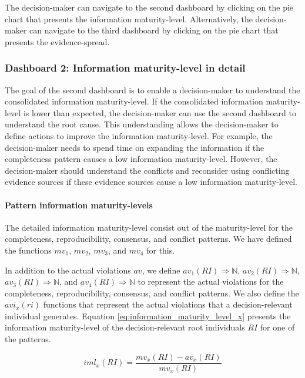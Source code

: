 The decision-maker can navigate to the second dashboard by clicking on the pie chart that presents the information maturity-level. Alternatively, the decision-maker can navigate to the third dashboard by clicking on the pie chart that presents the evidence-spread.

\subsubsection{Dashboard 2: Information maturity-level in detail}
The goal of the second dashboard is to enable a decision-maker to understand the consolidated information maturity-level. If the consolidated information maturity-level is lower than expected, the decision-maker can use the second dashboard to understand the root cause. This understanding allows the decision-maker to define actions to improve the information maturity-level. For example, the decision-maker needs to spend time on expanding the information if the completeness pattern causes a low information maturity-level. However, the decision-maker should understand the conflicts and reconsider using conflicting evidence sources if these evidence sources cause a low information maturity-level.

\paragraph{Pattern information maturity-levels}
The detailed information maturity-level consist out of the maturity-level for the completeness, reproducibility, consensus, and conflict patterns. We have defined the functions $mv_1$, $mv_2$, $mv_3$, and $mv_4$ for this. 

In addition to the actual violations $av$, we define $av_1(RI) \Rightarrow \mathbb{N}$, $av_2(RI) \Rightarrow \mathbb{N}$, $av_3(RI) \Rightarrow \mathbb{N}$, and $av_4(RI) \Rightarrow \mathbb{N}$ to represent the actual violations for the completeness, reproducibility, consensus, and conflict patterns. We also define the $avi_x(ri)$ functions that represent the actual violations that a decision-relevant individual generates. Equation \ref{eq:information_maturity_level_x} presents the information maturity-level of the decision-relevant root individuals $RI$ for one of the patterns.

\begin{equation} \label{eq:information_maturity_level_x}
iml_x(RI) = \dfrac{mv_x(RI)-av_x(RI)}{mv_x(RI)}
\end{equation}

